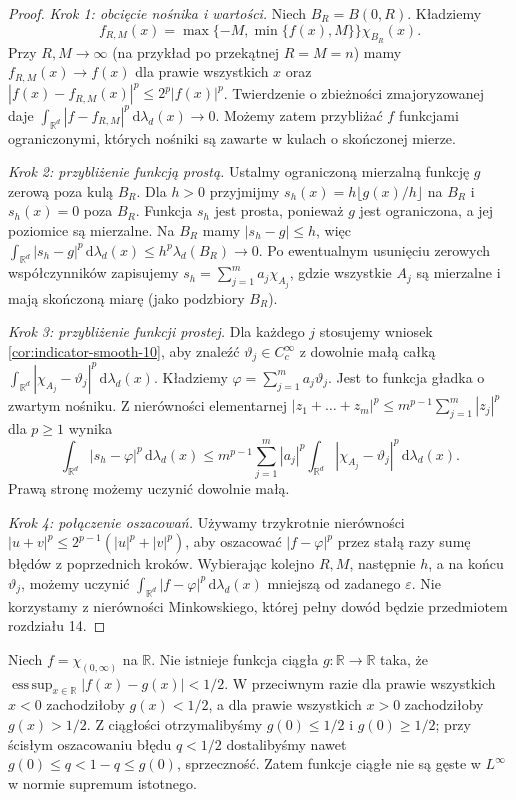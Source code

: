 \begin{proof}
\textit{Krok 1: obcięcie nośnika i wartości.}
Niech $B_R=B(0,R)$. Kładziemy
\[
f_{R,M}(x)=\max\{-M,\min\{f(x),M\}\}\chi_{B_R}(x).
\]
Przy $R,M\to\infty$ (na przykład po przekątnej
$R=M=n$) mamy $f_{R,M}(x)\to f(x)$ dla prawie
wszystkich $x$ oraz
$|f(x)-f_{R,M}(x)|^p\le 2^p|f(x)|^p$.
Twierdzenie o zbieżności zmajoryzowanej daje
$\int_{\mathbb R^d}|f-f_{R,M}|^p\,\mathrm d\lambda_d(x)\to0$. Możemy zatem przybliżać
$f$ funkcjami ograniczonymi, których nośniki są
zawarte w kulach o skończonej mierze.

\textit{Krok 2: przybliżenie funkcją prostą.}
Ustalmy ograniczoną mierzalną funkcję $g$
zerową poza kulą $B_R$. Dla $h>0$ przyjmijmy
$s_h(x)=h\lfloor g(x)/h\rfloor$ na $B_R$ i
$s_h(x)=0$ poza $B_R$. Funkcja $s_h$ jest prosta,
ponieważ $g$ jest ograniczona, a jej poziomice
są mierzalne. Na $B_R$ mamy $|s_h-g|\le h$,
więc
$\int_{\mathbb R^d}|s_h-g|^p\,\mathrm d\lambda_d(x)
\le h^p\lambda_d(B_R)\to0$.
Po ewentualnym usunięciu zerowych współczynników
zapisujemy $s_h=\sum_{j=1}^m a_j\chi_{A_j}$,
gdzie wszystkie $A_j$ są mierzalne i mają skończoną
miarę (jako podzbiory $B_R$).

\textit{Krok 3: przybliżenie funkcji prostej.}
Dla każdego $j$ stosujemy wniosek
\ref{cor:indicator-smooth-10}, aby znaleźć
$\vartheta_j\in C_c^\infty$ z dowolnie małą całką
$\int_{\mathbb R^d}|\chi_{A_j}-\vartheta_j|^p\,\mathrm d\lambda_d(x)$.
Kładziemy $\varphi=\sum_{j=1}^m a_j\vartheta_j$.
Jest to funkcja gładka o zwartym nośniku.
Z nierówności elementarnej
$|z_1+\dots+z_m|^p\le m^{p-1}
\sum_{j=1}^m|z_j|^p$ dla $p\ge1$ wynika
\[
\int_{\mathbb R^d}|s_h-\varphi|^p
\,\mathrm d\lambda_d(x)
\le m^{p-1}\sum_{j=1}^m|a_j|^p
\int_{\mathbb R^d}|\chi_{A_j}-\vartheta_j|^p
\,\mathrm d\lambda_d(x).
\]
Prawą stronę możemy uczynić dowolnie małą.

\textit{Krok 4: połączenie oszacowań.}
Używamy trzykrotnie nierówności
$|u+v|^p\le 2^{p-1}(|u|^p+|v|^p)$,
aby oszacować $|f-\varphi|^p$ przez stałą
razy sumę błędów z poprzednich kroków.
Wybierając kolejno $R,M$, następnie $h$,
a na końcu $\vartheta_j$, możemy uczynić
$\int_{\mathbb R^d}|f-\varphi|^p\,\mathrm d\lambda_d(x)$ mniejszą od zadanego
$\varepsilon$. Nie korzystamy z nierówności
Minkowskiego, której pełny dowód będzie
przedmiotem rozdziału 14.
\end{proof}

\begin{przyklad}[Dlaczego nie można zastąpić $p<\infty$ przez $p=\infty$]
Niech $f=\chi_{(0,\infty)}$ na $\mathbb R$.
Nie istnieje funkcja ciągła $g:\mathbb R\to\mathbb R$
taka, że $\operatorname*{ess\,sup}_{x\in\mathbb R}
|f(x)-g(x)|<1/2$. W przeciwnym razie dla prawie
wszystkich $x<0$ zachodziłoby $g(x)<1/2$,
a dla prawie wszystkich $x>0$ zachodziłoby
$g(x)>1/2$. Z ciągłości otrzymalibyśmy
$g(0)\le1/2$ i $g(0)\ge1/2$; przy ścisłym
oszacowaniu błędu $q<1/2$ dostalibyśmy nawet
$g(0)\le q<1-q\le g(0)$, sprzeczność.
Zatem funkcje ciągłe nie są gęste w $L^\infty$
w normie supremum istotnego.
\end{przyklad}


